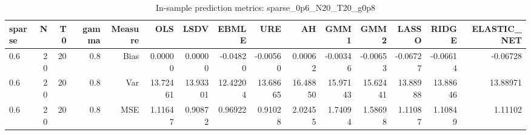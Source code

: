\begin{table}[!htbp]\centering
\caption{In-sample prediction metrics: sparse_0p6_N20_T20_g0p8}
\label{tab:table2_sparse_0p6_N20_T20_g0p8}
\begin{tabular}{lrrrrrrrrrrrrrr}
\hline
sparse & N & T0 & gamma & Measure & OLS & LSDV & EBMLE & URE & AH & GMM1 & GMM2 & LASSO & RIDGE & ELASTIC_NET \\
\hline
0.6 & 20 & 20 & 0.8 & Bias & 0.00000 & 0.00000 & -0.04820 & -0.00560 & 0.00062 & -0.00346 & -0.00653 & -0.06727 & -0.06614 & -0.06728 \\
0.6 & 20 & 20 & 0.8 & Var & 13.72461 & 13.93301 & 12.42204 & 13.68665 & 16.48850 & 15.97143 & 15.62441 & 13.88988 & 13.88646 & 13.88971 \\
0.6 & 20 & 20 & 0.8 & MSE & 1.11647 & 0.90872 & 0.96922 & 0.91028 & 2.02455 & 1.74094 & 1.58698 & 1.11087 & 1.10849 & 1.11102 \\
\hline
\end{tabular}
\end{table}

